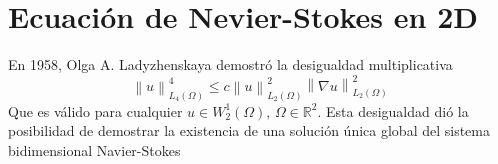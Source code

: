 




\section{Ecuación de Nevier-Stokes en 2D}
En 1958\cite{ladyzhenskaya1969mathematical}, Olga A. Ladyzhenskaya demostró la desigualdad multiplicativa
\begin{equation}
    \left\lVert u \right\rVert_{L_4(\Omega)}^4\leq c \left\lVert u\right\rVert_{L_2(\Omega)}^2\left\lVert \nabla u\right\rVert_{L_2(\Omega)}^2  
\end{equation}
Que es válido para cualquier $u\in W_2^1(\Omega),\, \Omega\in \mathbb{R}^2$. Esta desigualdad dió la posibilidad de demostrar la existencia de una solución única global del sistema bidimensional Navier-Stokes
